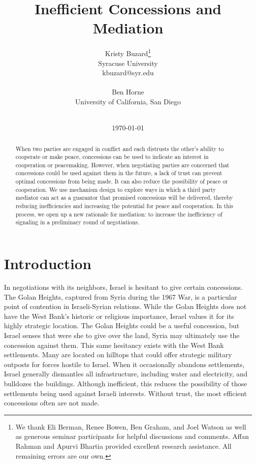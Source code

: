 \documentclass[12pt, letterpaper]{article}
\title{Inefficient Concessions and Mediation}
\author{Kristy Buzard\footnote{We thank Eli Berman, Renee Bowen, Ben Graham, and Joel Watson as well as generous seminar
participants for helpful discussions and comments. Affan Rahman and Apurvi Bhartia provided excellent research assistance. All remaining errors are our own.}\\
Syracuse University \\
kbuzard@syr.edu\\
\\
Ben Horne\\ 
University of California, San Diego\\
\\}
\date{\today}
\begin{document}
\maketitle

\begin{abstract}
When two parties are engaged in conflict and each distrusts the other's ability to cooperate or make peace, concessions can be used to indicate an interest in cooperation or peacemaking. However, when negotiating parties are concerned that concessions could be used against them in the future, a lack of trust can prevent optimal concessions from being made. It can also reduce the possibility of peace or cooperation. We use mechanism design to explore ways in which a third party mediator can act as a guarantor that promised concessions will be delivered, thereby reducing inefficiencies and increasing the potential for peace and cooperation. In this process, we open up a new rationale for mediation: to increase the inefficiency of signaling in a preliminary round of negotiations. 
\end{abstract}



\section{Introduction} 

In negotiations with its neighbors, Israel is hesitant to give certain concessions. The Golan Heights, captured from Syria during the 1967 War, is a particular point of contention in Israeli-Syrian relations. While the Golan Heights does not have the West Bank’s historic or religious importance, Israel values it for its highly strategic location. The Golan Heights could be a useful concession, but Israel senses that were she to give over the land, Syria may ultimately use the concession against them. This same hesitancy exists with the West Bank settlements. Many are located on hilltops that could offer strategic military outposts for forces hostile to Israel. When it occasionally abandons settlements, Israel generally dismantles all infrastructure, including water and electricity, and bulldozes the buildings. Although inefficient, this reduces the possibility of those settlements being used against Israeli interests. Without trust, the most efficient concessions often are not made.
\end{document}
